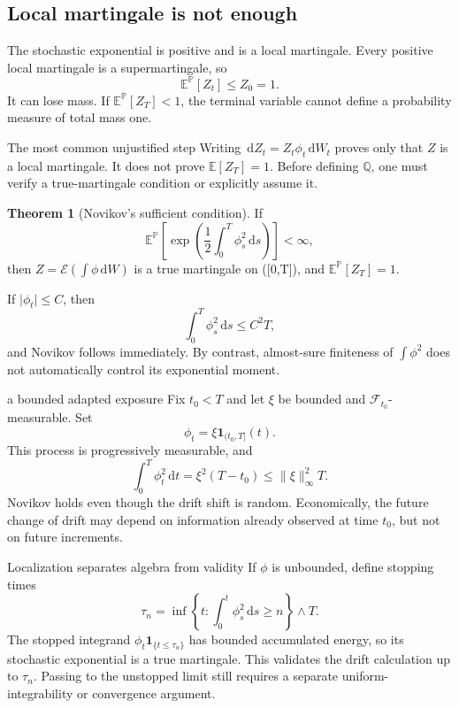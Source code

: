 \documentclass[10pt]{article}
\newcommand{\E}{\mathbb E}
\newcommand{\Pp}{\mathbb P}
\newcommand{\Q}{\mathbb Q}
\newcommand{\1}{\mathbf 1}
\newcommand{\cF}{\mathcal F}
\newcommand{\dd}{\,\mathrm d}
\theoremstyle{definition}
\newtheorem{theorem}[definition]{Theorem}
\begin{document}
\subsection{Local martingale is not enough}

The stochastic exponential is positive and is a local martingale. Every
positive local martingale is a supermartingale, so
\[
\E^{\Pp}[Z_t]\leq Z_0=1.
\]
It can lose mass. If \(\E^{\Pp}[Z_T]<1\), the terminal variable cannot define
a probability measure of total mass one.

\begin{warningbox}{The most common unjustified step}
Writing \(\dd Z_t=Z_t\phi_t\dd W_t\) proves only that \(Z\) is a local
martingale. It does not prove \(\E[Z_T]=1\). Before defining \(\Q\), one must
verify a true-martingale condition or explicitly assume it.
\end{warningbox}

\begin{theorem}[Novikov's sufficient condition]
If
\[
\boxed{
\E^{\Pp}\!\left[
\exp\!\left(\frac12\int_0^T\phi_s^2\dd s\right)
\right]<\infty,}
\]
then \(Z=\mathcal E(\int\phi\dd W)\) is a true martingale on ([0,T]), and
\(\E^{\Pp}[Z_T]=1\).
\end{theorem}

If \(\lvert\phi_t\rvert\leq C\), then
\[
\int_0^T\phi_s^2\dd s\leq C^2T,
\]
and Novikov follows immediately. By contrast, almost-sure finiteness of
\(\int\phi^2\) does not automatically control its exponential moment.

\begin{boardexample}{a bounded adapted exposure}
Fix \(t_0<T\) and let \(\xi\) be bounded and \(\cF_{t_0}\)-measurable. Set
\[
\phi_t=\xi\1_{(t_0,T]}(t).
\]
This process is progressively measurable, and
\[
\int_0^T\phi_t^2\dd t=\xi^2(T-t_0)\leq
\|\xi\|_\infty^2T.
\]
Novikov holds even though the drift shift is random. Economically, the
future change of drift may depend on information already observed at time
\(t_0\), but not on future increments.
\end{boardexample}

\begin{keyidea}{Localization separates algebra from validity}
If \(\phi\) is unbounded, define stopping times
\[
\tau_n=\inf\left\{t:\int_0^t\phi_s^2\dd s\geq n\right\}\wedge T.
\]
The stopped integrand \(\phi_t\1_{\{t\leq\tau_n\}}\) has bounded accumulated
energy, so its stochastic exponential is a true martingale. This validates
the drift calculation up to \(\tau_n\). Passing to the unstopped limit still
requires a separate uniform-integrability or convergence argument.
\end{keyidea}
\end{document}
